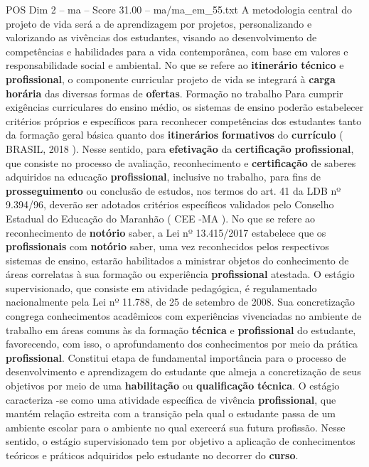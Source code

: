 \begin{textsample}{POS Dim 2 – ma – Score 31.00 – ma/ma\_em\_55.txt}
A metodologia central do projeto de vida será a de aprendizagem por projetos, personalizando e valorizando as vivências dos estudantes, visando ao desenvolvimento de competências e habilidades para a vida contemporânea, com base em valores e responsabilidade social e ambiental.
No que se refere ao \textbf{itinerário} \textbf{técnico} e \textbf{profissional}, o componente curricular projeto de vida se integrará à \textbf{carga} \textbf{horária} das diversas formas de \textbf{ofertas}.
Formação no trabalho Para cumprir exigências curriculares do ensino médio, os sistemas de ensino poderão estabelecer critérios próprios e específicos para reconhecer competências dos estudantes tanto da formação geral básica quanto dos \textbf{itinerários} \textbf{formativos} do \textbf{currículo} ( BRASIL, 2018 ).
Nesse sentido, para \textbf{efetivação} da \textbf{certificação} \textbf{profissional}, que consiste no processo de avaliação, reconhecimento e \textbf{certificação} de saberes adquiridos na educação \textbf{profissional}, inclusive no trabalho, para fins de \textbf{prosseguimento} ou conclusão de estudos, nos termos do art. 41 da LDB nº 9.394/96, deverão ser adotados critérios específicos validados pelo Conselho Estadual do Educação do Maranhão ( CEE -MA ).
No que se refere ao reconhecimento de \textbf{notório} saber, a Lei nº 13.415/2017 estabelece que os \textbf{profissionais} com \textbf{notório} saber, uma vez reconhecidos pelos respectivos sistemas de ensino, estarão habilitados a ministrar objetos do conhecimento de áreas correlatas à sua formação ou experiência \textbf{profissional} atestada.
O estágio supervisionado, que consiste em atividade pedagógica, é regulamentado nacionalmente pela Lei nº 11.788, de 25 de setembro de 2008.
Sua concretização congrega conhecimentos acadêmicos com experiências vivenciadas no ambiente de trabalho em áreas comuns às da formação \textbf{técnica} e \textbf{profissional} do estudante, favorecendo, com isso, o aprofundamento dos conhecimentos por meio da prática \textbf{profissional}.
Constitui etapa de fundamental importância para o processo de desenvolvimento e aprendizagem do estudante que almeja a concretização de seus objetivos por meio de uma \textbf{habilitação} ou \textbf{qualificação} \textbf{técnica}.
O estágio caracteriza -se como uma atividade específica de vivência \textbf{profissional}, que mantém relação estreita com a transição pela qual o estudante passa de um ambiente escolar para o ambiente no qual exercerá sua futura profissão.
Nesse sentido, o estágio supervisionado tem por objetivo a aplicação de conhecimentos teóricos e práticos adquiridos pelo estudante no decorrer do \textbf{curso}.

\end{textsample}
